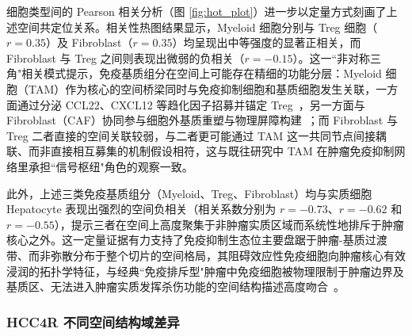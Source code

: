 \documentclass[12pt, a4paper]{ctexart}
\begin{document}
细胞类型间的 Pearson 相关分析（图 \ref{fig:hot_plot}）进一步以定量方式刻画了上述空间共定位关系。相关性热图结果显示，Myeloid 细胞分别与 Treg 细胞（$r = 0.35$）及 Fibroblast（$r = 0.35$）均呈现出中等强度的显著正相关，而 Fibroblast 与 Treg 之间则表现出微弱的负相关（$r = -0.15$）。这一``非对称三角"相关模式提示，免疫基质组分在空间上可能存在精细的功能分层：Myeloid 细胞（TAM）作为核心的空间桥梁同时与免疫抑制细胞和基质细胞发生关联，一方面通过分泌 CCL22、CXCL12 等趋化因子招募并锚定 Treg~\citep{noy2014tumor,curiel2004specific}，另一方面与 Fibroblast（CAF）协同参与细胞外基质重塑与物理屏障构建~\citep{kalluri2016biology}；而 Fibroblast 与 Treg 二者直接的空间关联较弱，与二者更可能通过 TAM 这一共同节点间接耦联、而非直接相互募集的机制假设相符，这与既往研究中 TAM 在肿瘤免疫抑制网络里承担``信号枢纽"角色的观察一致。

此外，上述三类免疫基质组分（Myeloid、Treg、Fibroblast）均与实质细胞 Hepatocyte 表现出强烈的空间负相关（相关系数分别为 $r = -0.73$、$r = -0.62$ 和 $r = -0.55$），提示三者在空间上高度聚集于非肿瘤实质区域而系统性地排斥于肿瘤核心之外。这一定量证据有力支持了免疫抑制生态位主要盘踞于肿瘤-基质过渡带、而非弥散分布于整个切片的空间格局，其阻碍效应性免疫细胞向肿瘤核心有效浸润的拓扑学特征，与经典``免疫排斥型"肿瘤中免疫细胞被物理限制于肿瘤边界及基质区、无法进入肿瘤实质发挥杀伤功能的空间结构描述高度吻合~\citep{llovet2021hepatocellular}。

\subsubsection{HCC4R 不同空间结构域差异}
\end{document}
